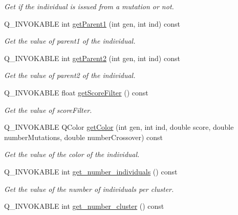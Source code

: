 \begin{DoxyCompactItemize}
\begin{DoxyCompactList}\small\item\em Get if the individual is issued from a mutation or not. \end{DoxyCompactList}\item 
Q\+\_\+\+I\+N\+V\+O\+K\+A\+B\+LE int \hyperlink{class_population_table_model_aa64e2a825ef14aeb8f28ec6fe47af7ee}{get\+Parent1} (int gen, int ind) const
\begin{DoxyCompactList}\small\item\em Get the value of parent1 of the individual. \end{DoxyCompactList}\item 
Q\+\_\+\+I\+N\+V\+O\+K\+A\+B\+LE int \hyperlink{class_population_table_model_afc593da9807c8075c8a86950a77c0f34}{get\+Parent2} (int gen, int ind) const
\begin{DoxyCompactList}\small\item\em Get the value of parent2 of the individual. \end{DoxyCompactList}\item 
Q\+\_\+\+I\+N\+V\+O\+K\+A\+B\+LE float \hyperlink{class_population_table_model_a2972b6a98b83d15ce54e968b93f4d641}{get\+Score\+Filter} () const
\begin{DoxyCompactList}\small\item\em Get the value of score\+Filter. \end{DoxyCompactList}\item 
Q\+\_\+\+I\+N\+V\+O\+K\+A\+B\+LE Q\+Color \hyperlink{class_population_table_model_a0884595d8787c90834612286bb075b08}{get\+Color} (int gen, int ind, double score, double number\+Mutations, double number\+Crossover) const
\begin{DoxyCompactList}\small\item\em Get the value of the color of the individual. \end{DoxyCompactList}\item 
Q\+\_\+\+I\+N\+V\+O\+K\+A\+B\+LE int \hyperlink{class_population_table_model_a55645bd382b985516e0dfd6945f17b40}{get\+\_\+number\+\_\+individuals} () const
\begin{DoxyCompactList}\small\item\em Get the value of the number of individuals per cluster. \end{DoxyCompactList}\item 
Q\+\_\+\+I\+N\+V\+O\+K\+A\+B\+LE int \hyperlink{class_population_table_model_a6306d2dbbc28778ca483dd1e7a394414}{get\+\_\+number\+\_\+cluster} () const

\end{DoxyCompactItemize}
